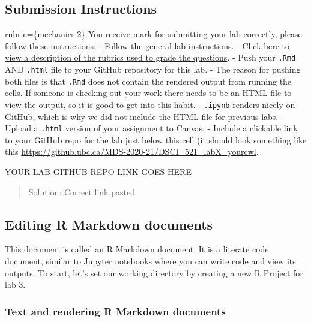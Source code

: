\documentclass[
]{article}
\begin{document}
\begin{alert alert-info}
\hypertarget{submission-instructions}{%
\subsection{Submission Instructions}\label{submission-instructions}}

rubric=\{mechanics:2\} You receive mark for submitting your lab
correctly, please follow these instructions: -
\href{https://ubc-mds.github.io/resources_pages/general_lab_instructions/}{Follow
the general lab instructions}. -
\href{https://github.com/UBC-MDS/public/tree/master/rubric}{Click here
to view a description of the rubrics used to grade the questions}. -
Push your \texttt{.Rmd} AND \texttt{.html} file to your GitHub
repository for this lab. - The reason for pushing both files is that
\texttt{.Rmd} does not contain the rendered output from running the
cells. If someone is checking out your work there needs to be an HTML
file to view the output, so it is good to get into this habit. -
\texttt{.ipynb} renders nicely on GitHub, which is why we did not
include the HTML file for previous labs. - Upload a \texttt{.html}
version of your assignment to Canvas. - Include a clickable link to your
GitHub repo for the lab just below this cell (it should look something
like this \url{https://github.ubc.ca/MDS-2020-21/DSCI_521_labX_yourcwl}.
\end{alert alert-info}

YOUR LAB GITHUB REPO LINK GOES HERE

\begin{quote}
Solution: Correct link pasted
\end{quote}

\hypertarget{editing-r-markdown-documents}{%
\subsection{Editing R Markdown
documents}\label{editing-r-markdown-documents}}

This document is called an R Markdown document. It is a literate code
document, similar to Jupyter notebooks where you can write code and view
its outputs. To start, let's set our working directory by creating a new
R Project for lab 3.

\hypertarget{text-and-rendering-r-markdown-documents}{%
\subsubsection{Text and rendering R Markdown
documents}\label{text-and-rendering-r-markdown-documents}}
\end{document}
